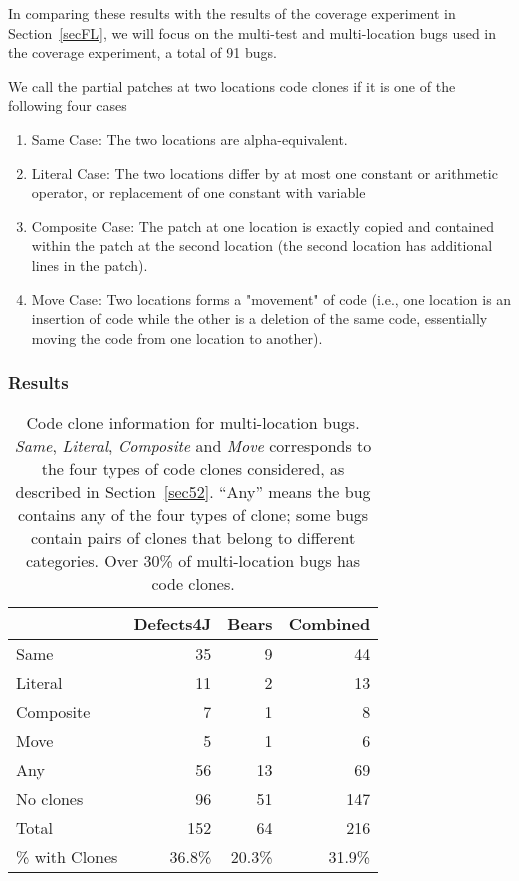 \documentclass[sigconf, timestamp-false, anonymous=true]{acmart}
\begin{document}
In comparing these results with the results of the coverage experiment in
Section~\ref{secFL}, we will focus on the multi-test and multi-location bugs used in the coverage 
experiment, a total of 91 bugs.

We call the partial patches at two locations code clones if it is one of the following four cases
\begin{enumerate}
	\item Same Case: The two locations are alpha-equivalent. 
	\item Literal Case: The two locations differ by at most one constant or arithmetic operator,
	or replacement of one constant with variable 
	\item Composite Case: The patch at one location is exactly copied and contained within the patch at 
	the 
	second location (the second location  has additional lines in the patch).
	\item Move Case: Two locations forms a "movement" of code (i.e., one location is an insertion of 
	code 
	while the other is a deletion of the same code, essentially moving the code from one location to 
	another).
\end{enumerate}

\subsubsection{Results}

\begin{table}
{\begin{center}
\begin{tabular} {lrrr}
\toprule
& Defects4J & Bears & Combined \\
\midrule
Same & 35 & 9 & 44  \\ 
Literal & 11 & 2 & 13  \\
Composite & 7 & 1 & 8  \\
Move & 5 & 1 & 6  \\
\midrule
Any & 56 & 13 & 69  \\
No clones & 96  &  51 & 147 \\
Total & 152 & 64 & 216 \\
\% with Clones & 36.8\% & 20.3\% & 31.9\% \\
\bottomrule
\end{tabular}
\end{center}
}
\caption{Code clone information for multi-location bugs. 
     \emph{Same}, \emph{Literal}, \emph{Composite} and \emph{Move} corresponds to the
    four types of code clones considered, as described in Section~\ref{sec52}. ``Any'' means the bug
    contains any of the four types of clone; some bugs contain
    pairs of clones that belong to different categories. 
    Over
    30\% of multi-location bugs has code clones.}
\label{tab:clones}
\end{table}
\end{document}
